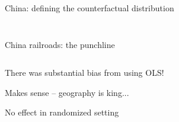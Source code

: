 \documentclass[notes,11pt, aspectratio=169]{beamer}
\newenvironment{wideitemize}{\itemize\addtolength{\itemsep}{10pt}}{\enditemize}
\begin{document}
\begin{frame}{ China: defining the counterfactual distribution}
\begin{columns}[T]
\begin{column}{.45\textwidth}
{{{    }}}
\end{column}%
\end{columns}
\end{frame}

\begin{frame}{China railroads: the punchline}
\begin{columns}[T] %
\begin{column}{.25\textwidth}
  \begin{wideitemize}
  \item There was substantial bias from using OLS!
  \item Makes sense -- geography is king...
  \item No effect in randomized setting
  \end{wideitemize}
\end{column}%
\hfill%
\begin{column}{.8\textwidth}
\end{column}%
\end{columns}
\end{frame}
\end{document}
